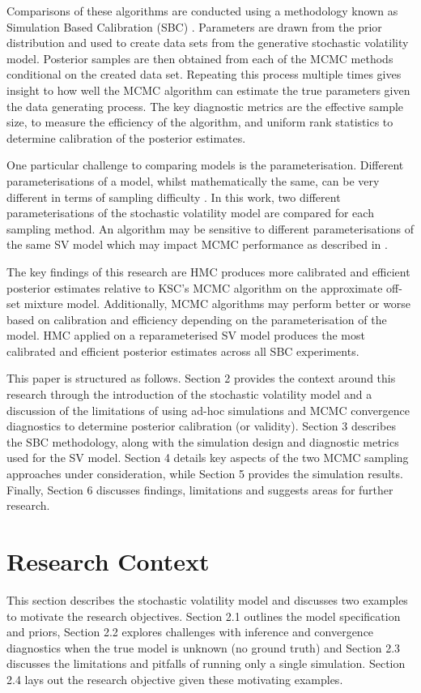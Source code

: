 \documentclass[12pt, a4paper]{article}
\begin{document}
    Comparisons of these algorithms are conducted using a methodology known as Simulation Based Calibration (SBC) \citep{talts2020validating}. Parameters are drawn from the prior distribution and used to create data sets from the generative stochastic volatility model. Posterior samples are then obtained from each of the MCMC methods conditional on the created data set. Repeating this process multiple times gives insight to how well the MCMC algorithm can estimate the true parameters given the data generating process. The key diagnostic metrics are the effective sample size, to measure the efficiency of the algorithm, and uniform rank statistics to determine calibration of the posterior estimates. 

    One particular challenge to comparing models is the parameterisation. Different parameterisations of a model, whilst mathematically the same, can be very different in terms of sampling difficulty \citep{neal2003slice}. In this work, two different parameterisations of the stochastic volatility model are compared for each sampling method. An algorithm may be sensitive to different parameterisations of the same SV model which may impact MCMC performance as described in \citet{strickland2008parameterisation}.
    
    The key findings of this research are HMC produces more calibrated and efficient posterior estimates relative to KSC's MCMC algorithm on the approximate off-set mixture model. Additionally, MCMC algorithms may perform better or worse based on calibration and efficiency depending on the parameterisation of the model. HMC applied on a reparameterised SV model produces the most calibrated and efficient posterior estimates across all SBC experiments.

    This paper is structured as follows. Section 2 provides the context around this research through the introduction of the stochastic volatility model and a discussion of the limitations of using ad-hoc simulations and MCMC convergence diagnostics to determine posterior calibration (or validity). Section 3 describes the SBC methodology, along with the simulation design and diagnostic metrics used for the SV model. Section 4 details key aspects of the two MCMC sampling approaches under consideration, while Section 5 provides the simulation results. Finally, Section 6 discusses findings, limitations and suggests areas for further research.

\section{Research Context}
This section describes the stochastic volatility model and discusses two examples to motivate the research objectives. Section 2.1 outlines the model specification and priors, Section 2.2 explores challenges with inference and convergence diagnostics when the true model is unknown (no ground truth) and Section 2.3 discusses the limitations and pitfalls of running only a single simulation. Section 2.4 lays out the research objective given these motivating examples.
\end{document}
